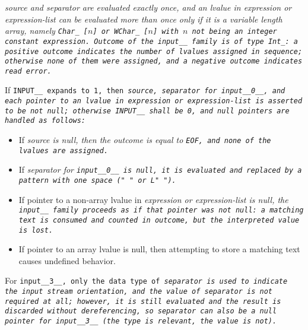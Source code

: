 \it{source} and \it{separator} are evaluated exactly once, and an lvalue
in \it{expression} or \it{expression-list} can be evaluated more than once
only if it is a variable length array, namely \tt{Char_ [}$n$\tt{]} or
\tt{WChar_ [}$n$\tt{]} with $n$ not being an integer constant expression.
Outcome of the \tt{input__} family is of type \tt{Int_}: a positive
outcome indicates the number of lvalues assigned in sequence; otherwise
none of them were assigned, and a negative outcome indicates read error.

If \tt{INPUT__} expands to \tt{1}, then \it{source}, \it{separator} for
\tt{input__0__}, and each pointer to an lvalue in \it{expression} or
\it{expression-list} is asserted to be not null; otherwise \tt{INPUT__}
shall be \tt{0}, and null pointers are handled as follows:

\begin{itemize}[nosep]

\item If \it{source} is null, then the outcome is equal to \tt{EOF},
and none of the lvalues are assigned.

\item If \it{separator} for \tt{input__0__} is null, it is evaluated
and replaced by a pattern with one space (\tt{" "} or \tt{L" "}).

\item If pointer to a non-array lvalue in \it{expression} or \it{expression-list}
is null, the \tt{input__} family proceeds as if that pointer was not null: a
matching text is consumed and counted in outcome, but the interpreted value is lost.

\item If pointer to an array lvalue is null,
then attempting to store a matching text causes undefined behavior.

\end{itemize}

\note For \tt{input__3__}, only the data type of \it{separator} is used
to indicate the input stream orientation, and the value of \it{separator}
is not required at all; however, it is still evaluated and the result
is discarded without dereferencing, so \it{separator} can also be a null
pointer for \tt{input__3__} (the type is relevant, the value is not).
